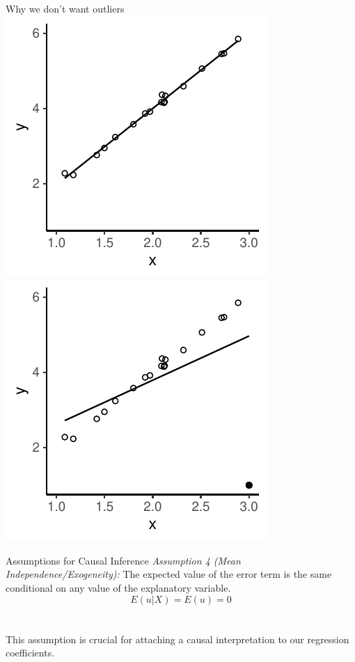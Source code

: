 \documentclass{./../div_teaching_slides}
\begin{document}
\begin{frame}{Why we don't want outliers}
\includegraphics{./../../output/outliers_without.pdf}
\includegraphics{./../../output/outliers_with.pdf}
\end{frame}


\begin{frame}{Assumptions for Causal Inference}
\vspace{0.5cm}
\textit{Assumption 4 (\textit{Mean Independence}/Exogeneity):} The expected value of the error term is the same conditional on any value of the explanatory variable.
$$ E(u|X)=E(u)=0 $$ \\~\\

This assumption is crucial for attaching a causal interpretation to our regression coefficients.
\end{frame}
\end{document}
